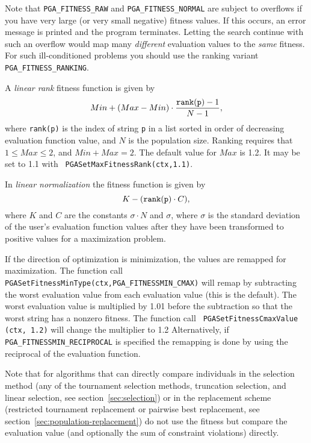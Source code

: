 \documentclass{report}
\begin{document}
Note that \verb+PGA_FITNESS_RAW+ and \verb+PGA_FITNESS_NORMAL+ are
subject to overflows if you have
very large (or very small negative) fitness values. If this occurs, an
error message is printed and the program terminates.
Letting the search continue with such an overflow would map many
\textit{different} evaluation values to the \textit{same} fitness.
For such ill-conditioned problems you should use the ranking
variant \verb+PGA_FITNESS_RANKING+.

A {\em linear rank} fitness function \cite{Ba87,Wh89} is given by
\begin{equation}
Min + (Max - Min)\cdot\frac{{\tt rank(p)}-1}{N-1},\label{eq:rank-select}
\end{equation}
where {\tt rank(p)} is the index of string {\tt p} in a list sorted in order
of decreasing evaluation function value, and $N$ is the population size.
Ranking requires that $1 \leq Max \leq 2$, and $Min + Max = 2$.  The default
value for $Max$ is 1.2.  It may be set to 1.1 with {\tt
PGASetMaxFitnessRank(ctx,1.1)}.

In {\em linear normalization} the fitness function is given by
\begin{equation}
K - ({\tt rank(p)} \cdot C),
\end{equation}
where $K$ and $C$ are the constants $\sigma \cdot N$ and $\sigma$,
where $\sigma$
is the standard deviation of the user's evaluation function values after they
have been transformed to positive values for a maximization problem.

If the direction of optimization is minimization, the values are remapped for
maximization.  The function call {\tt
PGASetFitnessMinType(ctx,PGA\_FITNESSMIN\_CMAX)} will remap by subtracting the
worst evaluation value from each evaluation value (this is the default).  The
worst evaluation value is multiplied by 1.01 before the subtraction so that
the worst string has a nonzero fitness.  The function call {\tt
PGASetFitnessCmaxValue (ctx, 1.2)} will change the multiplier to 1.2
Alternatively, if {\tt PGA\_FITNESSMIN\_RECIPROCAL} is specified the remapping
is done by using the reciprocal of the evaluation function.

Note that for algorithms that can directly compare individuals in the
selection method (any of the tournament selection methods, truncation
selection, and linear selection, see section~\ref{sec:selection}) or in
the replacement scheme (restricted tournament replacement or pairwise
best replacement, see section~\ref{sec:population-replacement}) do not
use the fitness but compare the evaluation value (and optionally the sum
of constraint violations) directly.
\end{document}
